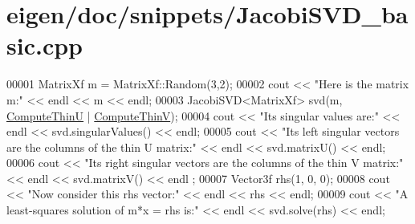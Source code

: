 \hypertarget{eigen_2doc_2snippets_2_jacobi_s_v_d__basic_8cpp_source}{}\section{eigen/doc/snippets/\+Jacobi\+S\+V\+D\+\_\+basic.cpp}
\label{eigen_2doc_2snippets_2_jacobi_s_v_d__basic_8cpp_source}

\begin{DoxyCode}
00001 MatrixXf m = MatrixXf::Random(3,2);
00002 cout << \textcolor{stringliteral}{"Here is the matrix m:"} << endl << m << endl;
00003 JacobiSVD<MatrixXf> svd(m, \hyperlink{group__enums_ggae3e239fb70022eb8747994cf5d68b4a9af8c742a1aa87773e165eae406c9ccaf8}{ComputeThinU} | \hyperlink{group__enums_ggae3e239fb70022eb8747994cf5d68b4a9a1055e53fa95c8ae04a07ebb72cfafd95}{ComputeThinV});
00004 cout << \textcolor{stringliteral}{"Its singular values are:"} << endl << svd.singularValues() << endl;
00005 cout << \textcolor{stringliteral}{"Its left singular vectors are the columns of the thin U matrix:"} << endl << svd.matrixU() << endl;
00006 cout << \textcolor{stringliteral}{"Its right singular vectors are the columns of the thin V matrix:"} << endl << svd.matrixV() << endl
      ;
00007 Vector3f rhs(1, 0, 0);
00008 cout << \textcolor{stringliteral}{"Now consider this rhs vector:"} << endl << rhs << endl;
00009 cout << \textcolor{stringliteral}{"A least-squares solution of m*x = rhs is:"} << endl << svd.solve(rhs) << endl;
\end{DoxyCode}
